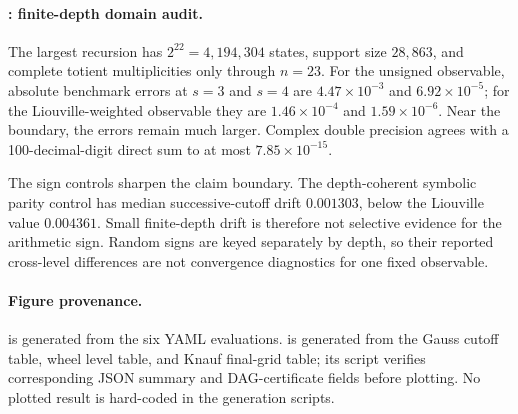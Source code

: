 \paragraph{: finite-depth domain audit.}
The largest recursion has \(2^{22}=4{,}194{,}304\) states, support size
\(28{,}863\), and complete totient multiplicities only through \(n=23\).
For the unsigned observable, absolute benchmark errors at \(s=3\) and \(s=4\)
are \(4.47\times10^{-3}\) and \(6.92\times10^{-5}\); for the
Liouville-weighted observable they are \(1.46\times10^{-4}\) and
\(1.59\times10^{-6}\).  Near the boundary, the errors remain much larger.
Complex double precision agrees with a 100-decimal-digit direct sum to at
most \(7.85\times10^{-15}\).

The sign controls sharpen the claim boundary.  The depth-coherent symbolic
parity control has median successive-cutoff drift \(0.001303\), below the
Liouville value \(0.004361\).  Small finite-depth drift is therefore not
selective evidence for the arithmetic sign.  Random signs are keyed
separately by depth, so their reported cross-level differences are not
convergence diagnostics for one fixed observable.

\paragraph{Figure provenance.}
 is generated from the six YAML evaluations.
 is generated from the Gauss cutoff table, wheel level
table, and Knauf final-grid table; its script verifies corresponding JSON
summary and DAG-certificate fields before plotting.  No plotted result is
hard-coded in the generation scripts.

